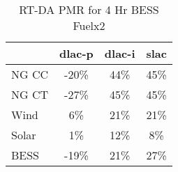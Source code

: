 \begin{table}[htbp]
\centering
\begin{tabular}{lccc}
\toprule
\hline
 & dlac-p & dlac-i & slac \\
\hline
\quad NG CC & -20\% & 44\% & 45\% \\
\quad NG CT & -27\% & 45\% & 45\% \\
\quad Wind & 6\% & 21\% & 21\% \\
\quad Solar & 1\% & 12\% & 8\% \\
\quad BESS & -19\% & 21\% & 27\% \\
\hline
\bottomrule
\end{tabular}
\caption{RT-DA PMR for 4 Hr BESS Fuelx2}
\label{tab:table4_4_Hr_BESS_Fuelx2}
\end{table}
